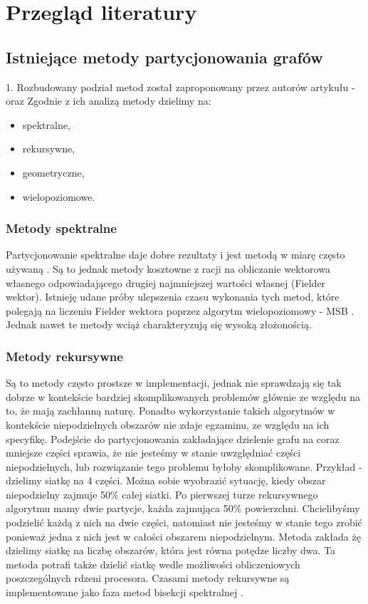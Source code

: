 \newpage


\section{Przegląd literatury}
\label{sec:literature}

\subsection{Istniejące metody partycjonowania grafów}

1. Rozbudowany podział metod został zaproponowany przez autorów artykułu - \cite{metis}
oraz \cite{1364754}
Zgodnie z ich analizą metody dzielimy na:
\begin{itemize}
    \item spektralne,
    \item rekursywne,
    \item geometryczne,
    \item wielopoziomowe.
\end{itemize}

\subsubsection{Metody spektralne}
Partycjonowanie spektralne daje dobre rezultaty i jest metodą w miarę często używaną
\cite{10.1137/0611030, 10.5555/147877.147902, improved_spectral}. Są to jednak metody kosztowne z racji na
obliczanie wektorowa własnego odpowiadającego drugiej najmniejszej wartości własnej (Fielder wektor).
Istnieję udane próby ulepszenia czasu wykonania tych metod, które polegają na liczeniu Fielder wektora poprzez
algorytm wielopoziomowy - MSB \cite{fast_multilevel}. Jednak nawet te metody wciąż charakteryzują się wysoką złożonością.

\subsubsection{Metody rekursywne}
Są to metody często prostsze w implementacji, jednak nie sprawdzają się tak dobrze w kontekście bardziej
skomplikowanych problemów głównie ze względu na to, że mają zachłanną naturę.
Ponadto wykorzystanie takich algorytmów w kontekście niepodzielnych obszarów nie zdaje egzaminu,
ze względu na ich specyfikę. Podejście do partycjonowania zakładające dzielenie grafu na coraz mniejsze
części sprawia, że nie jesteśmy w stanie uwzględniać części niepodzielnych, lub rozwiązanie tego problemu byłoby skomplikowane.
Przykład - dzielimy siatkę na 4 części. Można sobie wyobrazić sytuację, kiedy obszar niepodzielny zajmuje 50\% całej siatki.
Po pierwszej turze rekursywnego algorytmu mamy dwie partycje, każda zajmująca 50\% powierzchni. Chcielibyśmy podzielić
każdą z nich na dwie części, natomiast nie jesteśmy w stanie tego zrobić ponieważ jedna z nich jest w całości obszarem
niepodzielnym.
Metoda \cite{recursive} zakłada żę dzielimy siatkę na liczbę obszarów,
która jest równa potędze liczby dwa. Ta metoda potrafi także dzielić siatkę wedle możliwości obliczeniowych
poszczególnych rdzeni procesora. Czasami metody rekursywne są implementowane jako faza metod
bisekcji spektralnej \cite{10.1137/0611030}.

